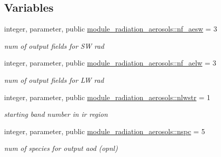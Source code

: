 \subsection*{Variables}
\begin{DoxyCompactItemize}
\item 
\mbox{\label{group__module__radiation__aerosols_gae0d9615fa694e2a5dfe8fb48e99b7e76}} 
integer, parameter, public \hyperlink{group__module__radiation__aerosols_gae0d9615fa694e2a5dfe8fb48e99b7e76}{module\+\_\+radiation\+\_\+aerosols\+::nf\+\_\+aesw} = 3
\begin{DoxyCompactList}\small\item\em num of output fields for SW rad \end{DoxyCompactList}\item 
\mbox{\label{group__module__radiation__aerosols_gafba0069cd611248a9595a126a13f5203}} 
integer, parameter, public \hyperlink{group__module__radiation__aerosols_gafba0069cd611248a9595a126a13f5203}{module\+\_\+radiation\+\_\+aerosols\+::nf\+\_\+aelw} = 3
\begin{DoxyCompactList}\small\item\em num of output fields for LW rad \end{DoxyCompactList}\item 
\mbox{\label{group__module__radiation__aerosols_ga654ab60d433133542d3c07edd2244566}} 
integer, parameter, public \hyperlink{group__module__radiation__aerosols_ga654ab60d433133542d3c07edd2244566}{module\+\_\+radiation\+\_\+aerosols\+::nlwstr} = 1
\begin{DoxyCompactList}\small\item\em starting band number in ir region \end{DoxyCompactList}\item 
\mbox{\label{group__module__radiation__aerosols_ga3d126c465af80bb698d9d1a288c181bb}} 
integer, parameter, public \hyperlink{group__module__radiation__aerosols_ga3d126c465af80bb698d9d1a288c181bb}{module\+\_\+radiation\+\_\+aerosols\+::nspc} = 5
\begin{DoxyCompactList}\small\item\em num of species for output aod (opnl) \end{DoxyCompactList}\item 

\end{DoxyCompactItemize}

